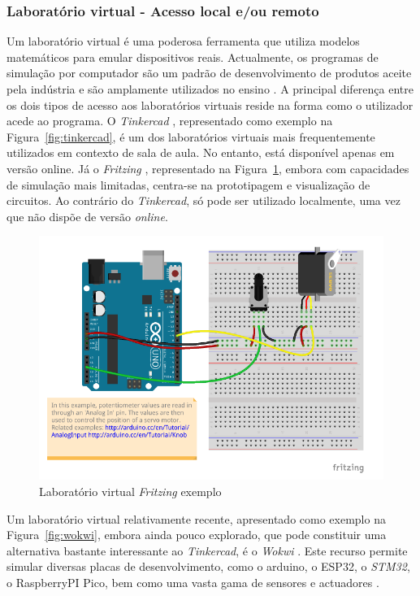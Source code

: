 \subsubsection{Laboratório virtual - Acesso local e/ou remoto}
Um laboratório virtual é uma poderosa ferramenta que utiliza modelos matemáticos para emular dispositivos reais. Actualmente, os programas de simulação por computador são um padrão de desenvolvimento de produtos aceite pela indústria e são amplamente utilizados no ensino \cite{HERADIO20161, POTKONJAK2016309}. A principal diferença entre os dois tipos de acesso aos laboratórios virtuais reside na forma como o utilizador acede ao programa. O \textit{Tinkercad} \cite{tinkercad}, representado como exemplo na Figura~\ref{fig:tinkercad}, é um dos laboratórios virtuais mais frequentemente utilizados em contexto de sala de aula. No entanto, está disponível apenas em versão online. Já o \textit{Fritzing} \cite{fritzingdown}, representado na Figura~\ref{fig:fritzing}, embora com capacidades de simulação mais limitadas, centra-se na prototipagem e visualização de circuitos. Ao contrário do \textit{Tinkercad}, só pode ser utilizado localmente, uma vez que não dispõe de versão \textit{online}.

\begin{figure}[hbtp]
    \centering
    \includegraphics[width=0.6\linewidth]{figures/fritzing.png}
    \caption{Laboratório virtual \textit{Fritzing} exemplo}
    \label{fig:fritzing}
\end{figure}

Um laboratório virtual relativamente recente, apresentado como exemplo na Figura~\ref{fig:wokwi}, embora ainda pouco explorado, que pode constituir uma alternativa bastante interessante ao \textit{Tinkercad}, é o \textit{Wokwi} \cite{wokwi}. Este recurso permite simular diversas placas de desenvolvimento, como o \gls{arduino}, o \gls{ESP32}, o \textit{STM32}, o \gls{RaspberryPI} Pico, bem como uma vasta gama de sensores e actuadores \cite{wokwi}.

